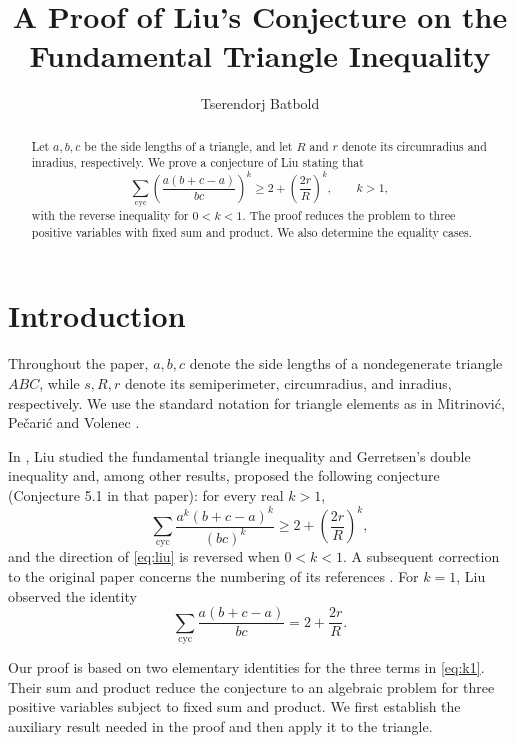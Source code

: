 \documentclass[11pt]{amsart}
\title{A Proof of Liu's Conjecture on the Fundamental Triangle Inequality}
\author[Ts. Batbold]{Tserendorj Batbold}
\theoremstyle{remark}
\newcommand{\cyc}{\sum_{\mathrm{cyc}}}
\begin{document}

\begin{abstract}
Let $a,b,c$ be the side lengths of a triangle, and let $R$ and $r$
denote its circumradius and inradius, respectively. We prove a conjecture
of Liu stating that
\[
 \cyc \left(\frac{a(b+c-a)}{bc}\right)^k
 \ge 2+\left(\frac{2r}{R}\right)^k, \qquad k>1,
\]
with the reverse inequality for $0<k<1$. The proof reduces the problem
to three positive variables with fixed sum and product. We also determine
the equality cases.
\end{abstract}

\maketitle

\section{Introduction}
Throughout the paper, $a,b,c$ denote the side lengths of a nondegenerate triangle $ABC$, while $s,R,r$ denote its semiperimeter, circumradius, and inradius, respectively. We use the standard notation for triangle elements as in Mitrinovi\'c, Pe\v{c}ari\'c and Volenec \cite{Mitrinovic1989}.

In \cite{Liu2022}, Liu studied the fundamental triangle inequality and Gerretsen's double inequality and, among other results, proposed the following conjecture (Conjecture 5.1 in that paper): for every real $k>1$,
\begin{equation}\label{eq:liu}
 \cyc \frac{a^k(b+c-a)^k}{(bc)^k}
 \ge 2+\left(\frac{2r}{R}\right)^k,
\end{equation}
and the direction of \eqref{eq:liu} is reversed when $0<k<1$. A subsequent correction to the original paper concerns the numbering of its references \cite{LiuCorrection2022}. For $k=1$, Liu observed the identity
\begin{equation}\label{eq:k1}
 \cyc \frac{a(b+c-a)}{bc}=2+\frac{2r}{R}.
\end{equation}

Our proof is based on two elementary identities for the three terms in \eqref{eq:k1}. Their sum and product reduce the conjecture to an algebraic problem for three positive variables subject to fixed sum and product. We first establish the auxiliary result needed in the proof and then apply it to the triangle.
\end{document}
